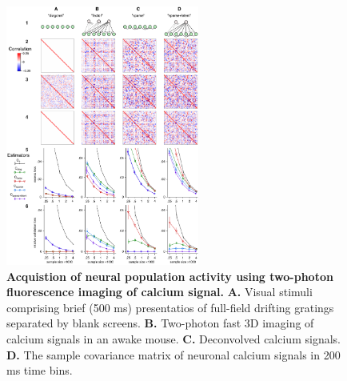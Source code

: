 \begin{figure}[htp]
\begin{center}
\includegraphics[width=2.5in]{figures/Figure1.pdf}
\end{center}
\caption{
{\bf Acquistion of neural population activity using two-photon fluorescence imaging of calcium signal.}  {\bf A.} Visual stimuli comprising brief (500 ms) presentatios of full-field drifting gratings separated by blank screens. {\bf B.} Two-photon fast 3D imaging of calcium signals in an awake mouse. {\bf C.} Deconvolved calcium signals. {\bf D.} The sample covariance matrix of neuronal calcium signals in 200 ms time bins. 
}
\label{Figure_label}
\end{figure}
